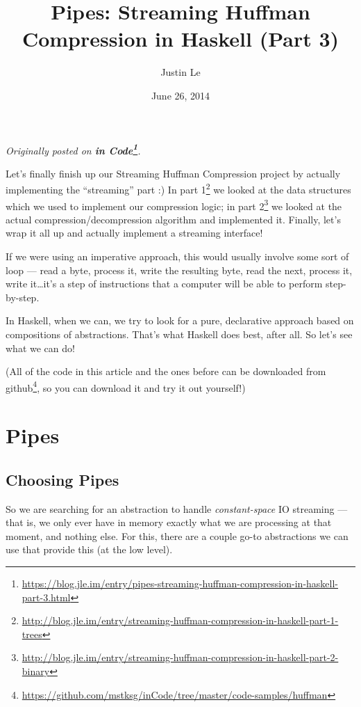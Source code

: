 \documentclass[]{article}
\title{Pipes: Streaming Huffman Compression in Haskell (Part 3)}
\author{Justin Le}
\date{June 26, 2014}
\renewcommand{\href}[2]{#2\footnote{\url{#1}}}
\begin{document}
\maketitle

\emph{Originally posted on
\textbf{\href{https://blog.jle.im/entry/pipes-streaming-huffman-compression-in-haskell-part-3.html}{in
Code}}.}

Let's finally finish up our Streaming Huffman Compression project by actually
implementing the ``streaming'' part :) In
\href{http://blog.jle.im/entry/streaming-huffman-compression-in-haskell-part-1-trees}{part
1} we looked at the data structures which we used to implement our compression
logic; in
\href{http://blog.jle.im/entry/streaming-huffman-compression-in-haskell-part-2-binary}{part
2} we looked at the actual compression/decompression algorithm and implemented
it. Finally, let's wrap it all up and actually implement a streaming interface!

If we were using an imperative approach, this would usually involve some sort of
loop --- read a byte, process it, write the resulting byte, read the next,
process it, write it\ldots{}it's a step of instructions that a computer will be
able to perform step-by-step.

In Haskell, when we can, we try to look for a pure, declarative approach based
on compositions of abstractions. That's what Haskell does best, after all. So
let's see what we can do!

(All of the code in this article and the ones before can be downloaded
\href{https://github.com/mstksg/inCode/tree/master/code-samples/huffman}{from
github}, so you can download it and try it out yourself!)

\hypertarget{pipes}{%
\section{Pipes}\label{pipes}}

\hypertarget{choosing-pipes}{%
\subsection{Choosing Pipes}\label{choosing-pipes}}

So we are searching for an abstraction to handle \emph{constant-space} IO
streaming --- that is, we only ever have in memory exactly what we are
processing at that moment, and nothing else. For this, there are a couple go-to
abstractions we can use that provide this (at the low level).
\end{document}
